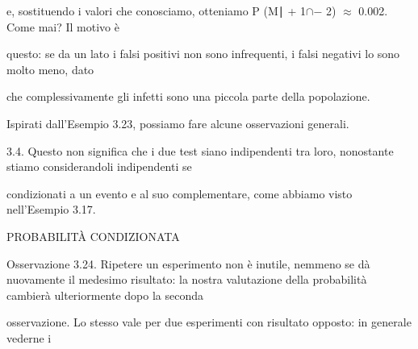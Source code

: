 \documentclass[a4paper,portrait,12pt]{article}
\begin{document}
\begin{flushleft}
e, sostituendo i valori che conosciamo, otteniamo P (M∣ + 1$\cap$$-$ 2) $\approx$ 0.002. Come mai? Il motivo \`{e}
\end{flushleft}


\begin{flushleft}
questo: se da un lato i falsi positivi non sono infrequenti, i falsi negativi lo sono molto meno, dato
\end{flushleft}


\begin{flushleft}
che complessivamente gli infetti sono una piccola parte della popolazione.
\end{flushleft}


\begin{flushleft}
Ispirati dall'Esempio 3.23, possiamo fare alcune osservazioni generali.
\end{flushleft}


\begin{flushleft}
3.4. Questo non significa che i due test siano indipendenti tra loro, nonostante stiamo considerandoli indipendenti se
\end{flushleft}


\begin{flushleft}
condizionati a un evento e al suo complementare, come abbiamo visto nell'Esempio 3.17.
\end{flushleft}










\begin{flushleft}
PROBABILIT\`{A} CONDIZIONATA
\end{flushleft}





\begin{flushleft}
Osservazione 3.24. Ripetere un esperimento non \`{e} inutile, nemmeno se d\`{a} nuovamente il medesimo risultato: la nostra valutazione della probabilit\`{a} cambier\`{a} ulteriormente dopo la seconda
\end{flushleft}


\begin{flushleft}
osservazione. Lo stesso vale per due esperimenti con risultato opposto: in generale vederne i
\end{flushleft}
\end{document}
